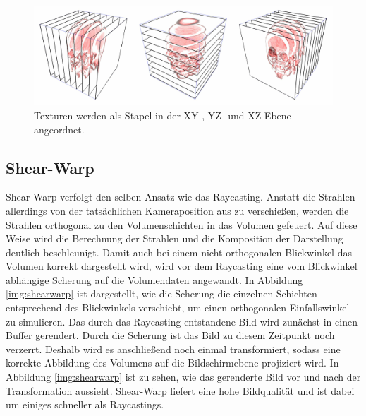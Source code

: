 

\begin{figure}[!htb]
	\centering
	\includegraphics[width=0.7\linewidth]{images/textureStacks.png}
	\caption{Texturen werden als Stapel in der 	XY-, YZ- und XZ-Ebene angeordnet.}
	\label{img:textureBased}
\end{figure}
\FloatBarrier

\subsection{Shear-Warp}

Shear-Warp verfolgt den selben Ansatz wie das Raycasting. Anstatt die Strahlen allerdings von der tatsächlichen Kameraposition aus zu verschießen, werden die Strahlen orthogonal zu den Volumenschichten in das Volumen gefeuert. Auf diese Weise wird die Berechnung der Strahlen und die Komposition der Darstellung deutlich beschleunigt. 
Damit auch bei einem nicht orthogonalen Blickwinkel das Volumen korrekt dargestellt wird, wird vor dem Raycasting eine vom Blickwinkel abhängige Scherung auf die Volumendaten angewandt. In Abbildung \ref{img:shearwarp} ist dargestellt, wie die Scherung die einzelnen Schichten entsprechend des Blickwinkels verschiebt, um einen orthogonalen Einfallswinkel zu simulieren. 
Das durch das Raycasting entstandene Bild wird zunächst in einen Buffer gerendert. Durch die Scherung ist das Bild zu diesem Zeitpunkt noch verzerrt. Deshalb wird es anschließend noch einmal transformiert, sodass eine korrekte Abbildung des Volumens auf die Bildschirmebene projiziert wird. In Abbildung \ref{img:shearwarp} ist zu sehen, wie das gerenderte Bild vor und nach der Transformation aussieht. 
Shear-Warp liefert eine hohe Bildqualität und ist dabei um einiges schneller als Raycastings. 

